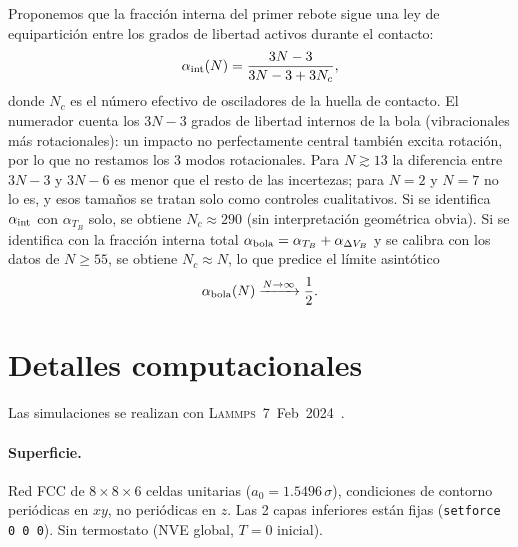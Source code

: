 \documentclass[aps,pre,twocolumn,reprint,superscriptaddress]{revtex4-2}
\newcommand{\lammps}{\textsc{Lammps}}
\begin{document}
Proponemos que la fracción interna del primer rebote sigue una ley de
equipartición entre los grados de libertad activos durante el contacto:
\begin{equation}
    \alpha_{\rm int}(N) = \frac{3N-3}{3N-3+3N_c},
    \label{eq:equiparticion}
\end{equation}
donde $N_c$ es el número efectivo de osciladores de la huella de contacto.
El numerador cuenta los $3N-3$ grados de libertad internos de la bola
(vibracionales más rotacionales): un impacto no perfectamente central también
excita rotación, por lo que no restamos los 3 modos rotacionales. Para
$N\gtrsim13$ la diferencia entre $3N-3$ y $3N-6$ es menor que el resto de
las incertezas; para $N=2$ y $N=7$ no lo es, y esos tamaños se tratan solo
como controles cualitativos.
Si se identifica $\alpha_{\rm int}$ con $\alpha_{T_B}$ solo, se obtiene
$N_c\approx290$ (sin interpretación geométrica obvia). Si se identifica con
la fracción interna total $\alpha_{\rm bola}=\alpha_{T_B}+\alpha_{\Delta V_B}$
y se calibra con los datos de $N\geq55$, se obtiene $N_c\approx N$, lo que
predice el límite asintótico
\begin{equation}
    \alpha_{\rm bola}(N)\xrightarrow{N\to\infty}\frac{1}{2}.
    \label{eq:limite}
\end{equation}

\section{Detalles computacionales}
\label{sec:lammps}

Las simulaciones se realizan con \lammps~7~Feb~2024~\cite{Thompson2022}.

\paragraph{Superficie.}
Red FCC de $8\times8\times6$ celdas unitarias ($a_0=1.5496\,\sigma$),
condiciones de contorno periódicas en $xy$, no periódicas en $z$.
Las 2 capas inferiores están fijas (\texttt{setforce 0 0 0}).
Sin termostato (NVE global, $T=0$ inicial).
\end{document}
